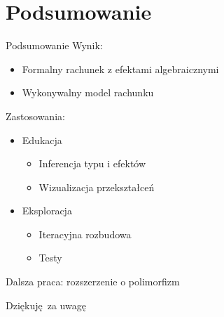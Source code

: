 \documentclass{beamer}
\begin{document}
\section{Podsumowanie}
\begin{frame}{Podsumowanie}
  Wynik:
  \begin{itemize}
    \item Formalny rachunek z efektami algebraicznymi
    \item Wykonywalny model rachunku
  \end{itemize}
  \vspace{\baselineskip}
  Zastosowania:
  \begin{itemize}
    \item Edukacja
    \begin{itemize}
      \item Inferencja typu i efektów
      \item Wizualizacja przekształceń
    \end{itemize}
    \item Eksploracja
    \begin{itemize}
      \item Iteracyjna rozbudowa
      \item Testy
    \end{itemize}
  \end{itemize}
  Dalsza praca: rozszerzenie o polimorfizm
\end{frame}

\begin{frame}
  \centering
  Dziękuję za uwagę
\end{frame}

\begin{frame}
  \titlepage
\end{frame}


\end{document}
